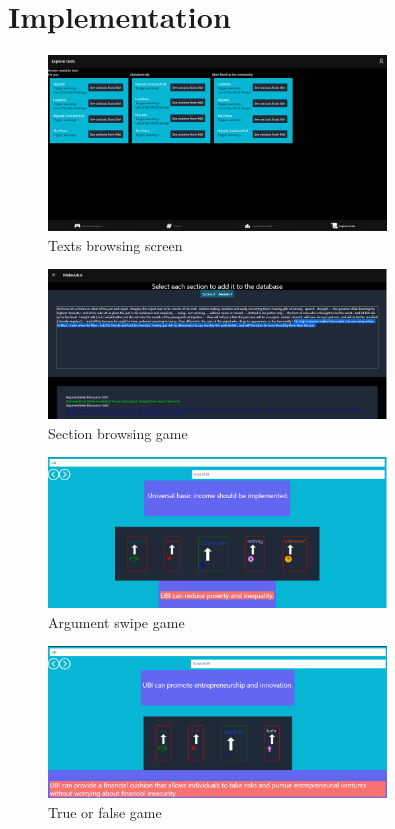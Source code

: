 \documentclass{report}
\begin{document}
\chapter{Implementation}

\begin{figure}[h]
    \centering
    \includegraphics[width=0.8\textwidth]{./images/browse-texts.png}
    \caption{Texts browsing screen}
\end{figure}

\begin{figure}[h]
    \centering
    \includegraphics[width=0.8\textwidth]{./images/section-reader.png}
    \caption{Section browsing game}
\end{figure}

\begin{figure}[h]
    \centering
    \includegraphics[width=0.8\textwidth]{./images/swipe-game.png}
    \caption{Argument swipe game}
\end{figure}


\begin{figure}[h]
    \centering
    \includegraphics[width=0.8\textwidth]{./images/truth-game.png}
    \caption{True or false game}
\end{figure}
\end{document}
